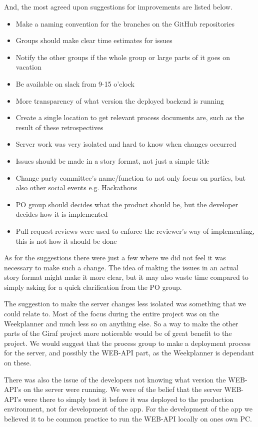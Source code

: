 And, the most agreed upon suggestions for improvements are listed below.
\begin{itemize}
  \item Make a naming convention for the branches on the GitHub repositories
  \item Groups should make clear time estimates for issues
  \item Notify the other groups if the whole group or large parts of it goes on vacation
  \item Be available on slack from 9-15 o'clock
  \item More transparency of what version the deployed backend is running
  \item Create a single location to get relevant process documents are, such as the result of these retrospectives
  \item Server work was very isolated and hard to know when changes occurred
  \item Issues should be made in a story format, not just a simple title
  \item Change party committee's name/function to not only focus on parties, but also other social events e.g. Hackathons
  \item PO group should decides what the product should be, but the developer decides how it is implemented
  \item Pull request reviews were used to enforce the reviewer's way of implementing, this is not how it should be done
\end{itemize}

As for the suggestions there were just a few where we did not feel it was necessary to make such a change.
The idea of making the issues in an actual story format might make it more clear, but it may also waste time compared to simply asking for a quick clarification from the PO group. 

The suggestion to make the server changes less isolated was something that we could relate to.
Most of the focus during the entire project was on the Weekplanner and much less so on anything else.
So a way to make the other parts of the Giraf project more noticeable would be of great benefit to the project.
We would suggest that the process group to make a deployment process for the server, and possibly the WEB-API part, as the Weekplanner is dependant on these.

There was also the issue of the developers not knowing what version the WEB-API's on the server were running.
We were of the belief that the server WEB-API's were there to simply test it before it was deployed to the production environment, not for development of the app.
For the development of the app we believed it to be common practice to run the WEB-API locally on ones own PC.


